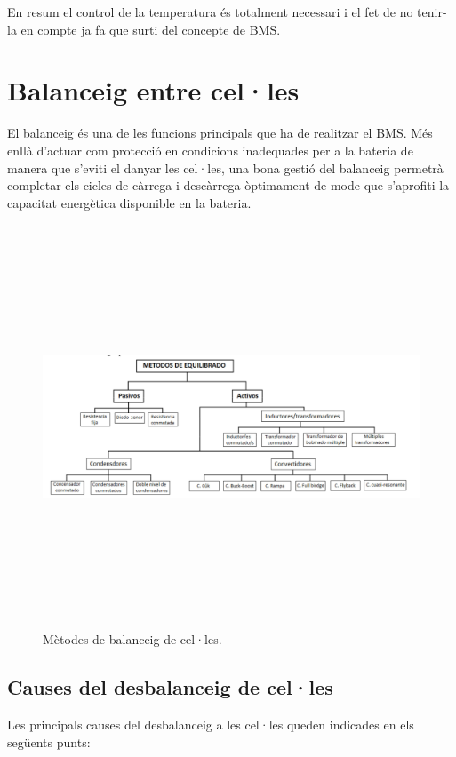En resum el control de la temperatura és totalment necessari i el fet de no tenir-la en compte ja fa que surti del concepte de BMS.

\newpage

\section{Balanceig entre cel·les}
El balanceig és una de les funcions principals que ha de realitzar el BMS. Més enllà d'actuar com protecció en condicions inadequades per a la bateria de manera que s'eviti el danyar les cel·les, una bona gestió del balanceig permetrà completar els cicles de càrrega i descàrrega òptimament de mode que s'aprofiti la capacitat energètica disponible en la bateria.

\begin{figure}[H]
	\centering
    \includegraphics[width=\textwidth, height=12cm] {BMS/metodosequilibrado.png}
    \caption{Mètodes de balanceig de cel·les.}
\end{figure}

\subsection{Causes del desbalanceig de cel·les}
Les principals causes del desbalanceig a les cel·les queden indicades en els següents punts:

